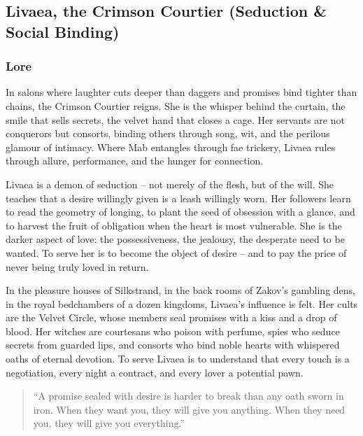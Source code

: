 
\subsection{Livaea, the Crimson Courtier (Seduction \& Social Binding)}

\subsubsection*{Lore}
In salons where laughter cuts deeper than daggers and promises bind tighter than chains, the Crimson Courtier reigns. She is the whisper behind the curtain, the smile that sells secrets, the velvet hand that closes a cage. Her servants are not conquerors but consorts, binding others through song, wit, and the perilous glamour of intimacy. Where Mab entangles through fae trickery, Livaea rules through allure, performance, and the hunger for connection.

Livaea is a demon of seduction -- not merely of the flesh, but of the will. She teaches that a desire willingly given is a leash willingly worn. Her followers learn to read the geometry of longing, to plant the seed of obsession with a glance, and to harvest the fruit of obligation when the heart is most vulnerable. She is the darker aspect of love: the possessiveness, the jealousy, the desperate need to be wanted. To serve her is to become the object of desire -- and to pay the price of never being truly loved in return.

In the pleasure houses of Silkstrand, in the back rooms of Zakov's gambling dens, in the royal bedchambers of a dozen kingdoms, Livaea's influence is felt. Her cults are the Velvet Circle, whose members seal promises with a kiss and a drop of blood. Her witches are courtesans who poison with perfume, spies who seduce secrets from guarded lips, and consorts who bind noble hearts with whispered oaths of eternal devotion. To serve Livaea is to understand that every touch is a negotiation, every night a contract, and every lover a potential pawn.

\begin{quote}
``A promise sealed with desire is harder to break than any oath sworn in iron. When they want you, they will give you anything. When they need you, they will give you everything.''
\end{quote}

